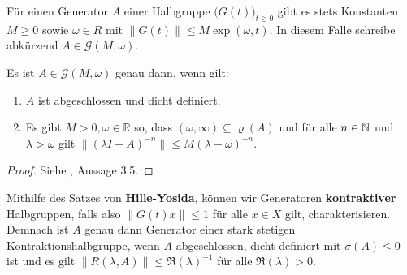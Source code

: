 \par
Für einen Generator $A$ einer Halbgruppe $\big(G(t)\big)_{t\geq0}$ gibt es stets Konstanten $M\geq0$ sowie $\omega\in R$ mit $\|G(t)\|\leq M\exp(\omega, t)$. In diesem Falle schreibe abkürzend  $A\in\mathcal G(M, \omega)$.

\begin{fsatz}
Es ist $A\in \mathcal G(M,\omega)$ genau dann, wenn gilt:
\begin{enumerate}
\item $A$ ist abgeschlossen und dicht definiert.
\item Es gibt $M> 0, \omega \in\mathbb R$ so, dass $(\omega, \infty)\subseteq \varrho(A)$ und für alle $n\in\mathbb{N}$ und $\lambda > \omega$ gilt $\|(\lambda I- A)^{-n}\|\leq M (\lambda - \omega)^{-n}$.
\end{enumerate}
\end{fsatz}

\begin{proof}
Siehe \cite{banasiak_arlotti_2006}, Aussage 3.5.
\end{proof}

\par
Mithilfe des Satzes von \textbf{Hille-Yosida}, können wir Generatoren \textbf{kontraktiver} Halbgruppen, falls also $\|G(t)x\|\leq 1$ für alle $x\in X$ gilt, charakterisieren. Demnach ist $A$ genau dann Generator einer stark stetigen Kontraktionshalbgruppe, wenn $A$  abgeschlossen, dicht definiert mit $\sigma(A)\leq 0$ ist und es gilt $\|R(\lambda, A)\|\leq \mathfrak R(\lambda)^{-1}$ für alle $\mathfrak R(\lambda) > 0$.


